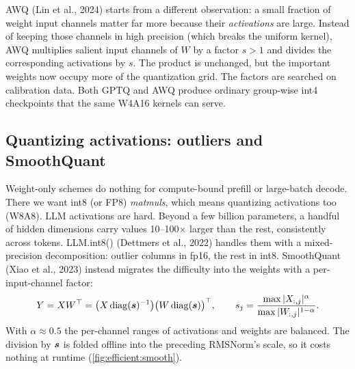 AWQ (Lin et al., 2024) starts from a different observation: a small fraction of weight
input channels matter far more because their \emph{activations} are large. Instead of
keeping those channels in high precision (which breaks the uniform kernel), AWQ
multiplies salient input channels of $W$ by a factor $s>1$ and divides the
corresponding activations by $s$. The product is unchanged, but the important weights
now occupy more of the quantization grid. The factors are searched on calibration data.
Both GPTQ and AWQ produce ordinary group-wise int4 checkpoints that the same W4A16
kernels can serve.

\subsection{Quantizing activations: outliers and SmoothQuant}
Weight-only schemes do nothing for compute-bound prefill or large-batch decode. There
we want int8 (or FP8) \emph{matmuls}, which means quantizing activations too (W8A8).
LLM activations are hard. Beyond a few billion parameters, a handful of hidden
dimensions carry values 10--100$\times$ larger than the rest, consistently across
tokens. LLM.int8() (Dettmers et al., 2022) handles them with a mixed-precision
decomposition: outlier columns in fp16, the rest in int8. SmoothQuant (Xiao et al.,
2023) instead migrates the difficulty into the weights with a per-input-channel factor:
\begin{equation}
  Y = X W^\top = \big(X\,\mathrm{diag}(\bm{s})^{-1}\big)\big(W\,\mathrm{diag}(\bm{s})\big)^\top,
  \qquad s_j = \frac{\max|X_{:,j}|^{\alpha}}{\max|W_{:,j}|^{1-\alpha}} .
  \label{eq:efficient:smooth}
\end{equation}
With $\alpha\approx0.5$ the per-channel ranges of activations and weights are balanced.
The division by $\bm{s}$ is folded offline into the preceding RMSNorm's scale, so it
costs nothing at runtime (\cref{fig:efficient:smooth}).


